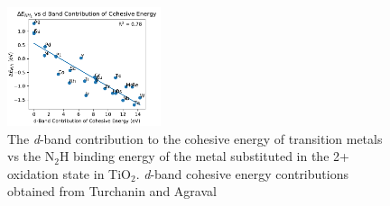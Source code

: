 


\begin{figure}
    \centering
    \includegraphics[width=0.4\textwidth]{Images/cohesive_eng_vs_N2H.pdf}
    
    \caption{The \textit{d}-band contribution to the cohesive energy of transition metals vs the N$_2$H binding energy of the metal substituted in the 2+ oxidation state in TiO$_2$. \textit{d}-band cohesive energy contributions obtained from Turchanin and Agraval\cite{Turchanin_2008}}
    \label{fig:N2H_cohesive}
\end{figure}

